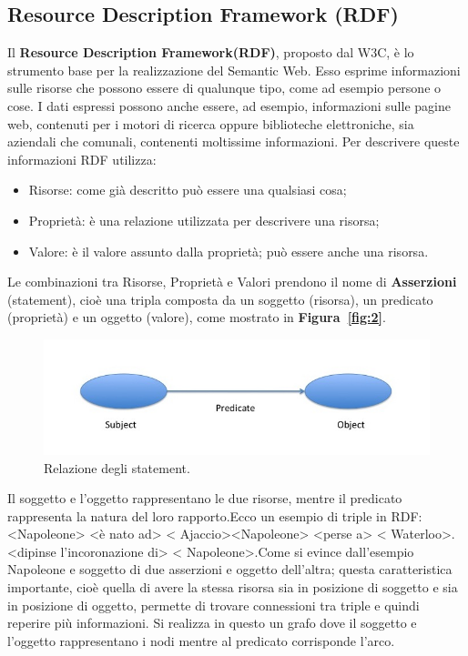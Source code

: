 \documentclass[a4paper,11pt]{article}
\begin{document}
\subsection{Resource Description Framework (RDF)}
\label{sec:2.2}
Il \textbf{Resource Description Framework(RDF)}, proposto dal W3C, è lo strumento base per la realizzazione del Semantic Web. Esso esprime informazioni sulle risorse che possono essere di qualunque tipo, come ad esempio persone o cose.\newline
I dati espressi possono anche essere, ad esempio, informazioni sulle pagine web, contenuti per i motori di ricerca oppure biblioteche elettroniche, sia aziendali che comunali, contenenti moltissime informazioni.
Per descrivere queste informazioni RDF utilizza:
\begin{itemize}
	\item Risorse: come già descritto può essere una qualsiasi cosa;
	\item Proprietà: è una relazione utilizzata per descrivere una risorsa;
	\item Valore: è il valore assunto dalla proprietà; può essere anche una risorsa.
\end{itemize}
Le combinazioni tra Risorse, Proprietà e Valori prendono il nome di \textbf{Asserzioni} (statement), cioè una tripla composta da un soggetto (risorsa), un predicato (proprietà) e un oggetto (valore), come mostrato in \textbf{Figura~\ref{fig:2}}.

\begin{figure}[htbp]
	\centering
	\includegraphics[scale=0.5]{Assertion.jpg}
	\caption{Relazione degli statement.}
	\label{fig:3}
\end{figure}\newpage 

Il soggetto e l'oggetto rappresentano le due risorse, mentre il predicato rappresenta la natura del loro rapporto.\newline Ecco un esempio di triple in RDF:\newline <Napoleone> <è nato ad> < Ajaccio>\newline <Napoleone> <perse a> < Waterloo>. <dipinse l'incoronazione di> < Napoleone>.\newline Come si evince dall'esempio Napoleone e soggetto di due asserzioni e oggetto dell'altra; questa caratteristica importante, cioè quella di avere la stessa risorsa sia in posizione di soggetto e sia in posizione di oggetto, permette di trovare connessioni tra triple e quindi reperire più informazioni.
Si realizza in questo un grafo dove il soggetto e l'oggetto rappresentano i nodi mentre al predicato corrisponde l'arco.
\end{document}
